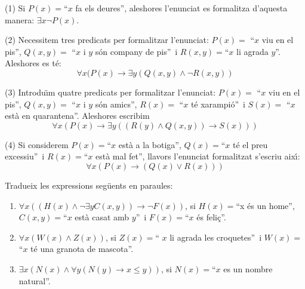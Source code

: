 \begin{solucio}
(1) Si $P(x)=$\textquotedblleft$x$ fa els deures\textquotedblright, aleshores
l'enunciat es formalitza d'aquesta manera: $\exists x\lnot P(x)$.

(2) Necessitem tres predicats per formalitzar l'enunciat: $P(x)=$%
\textquotedblleft$x$ viu en el pis\textquotedblright, $Q(x,y)=$%
\textquotedblleft$x$ i $y$ s\'{o}n company de pis\textquotedblright\ i
$R(x,y)=$\textquotedblleft$x$ li agrada $y$\textquotedblright. Aleshores es
t\'{e}:%
\[
\forall x(P(x)\longrightarrow\exists y\left(  Q\left(  x,y\right)  \wedge\lnot
R\left(  x,y\right)  \right)
\]


(3) Introdu\"{\i}m quatre predicats per formalitzar l'enunciat: $P(x)=$%
\textquotedblleft$x$ viu en el pis\textquotedblright, $Q(x,y)=$%
\textquotedblleft$x$ i $y$ s\'{o}n amics\textquotedblright, $R(x)=$%
\textquotedblleft$x$ t\'{e} xarampi\'{o}\textquotedblright\ i $S(x)=$%
\textquotedblleft$x$ est\`{a} en quarantena\textquotedblright. Aleshores
escribim%
\[
\forall x\left(  P(x)\longrightarrow\exists y\left(  \left(  R(y)\wedge
Q\left(  x,y\right)  \right)  \longrightarrow S(x)\right)  \right)
\]


(4) Si considerem $P(x)=$\textquotedblleft$x$ est\`{a} a la
botiga\textquotedblright, $Q(x)=$\textquotedblleft$x$ t\'{e} el preu
excessiu\textquotedblright\ i $R(x)=$\textquotedblleft$x$ est\`{a} mal
fet\textquotedblright, llavors l'enunciat formalitzat s'escriu aix\'{\i}:%
\[
\forall x\left(  P(x)\longrightarrow\left(  Q(x)\vee R(x)\right)  \right)
\]

\end{solucio}

\begin{exer}
Tradueix les expressions seg\"{u}ents en paraules:

\begin{enumerate}
\item $\forall x\left(  \left(  H(x)\wedge\lnot\exists yC(x,y)\right)
\longrightarrow\lnot F(x)\right)  $, si $H(x)=$\textquotedblleft x \'{e}s un
home\textquotedblright, $C(x,y)=$\textquotedblleft$x$ est\`{a} casat amb $y
$\textquotedblright\ i $F(x)=$\textquotedblleft$x$ \'{e}s
feli\c{c}\textquotedblright.

\item $\forall x\left(  W(x)\wedge Z(x)\right)  $, si $Z(x)=$\textquotedblleft%
$x$ li agrada les croquetes\textquotedblright\ i $W(x)=$\textquotedblleft$x$
t\'{e} una granota de mascota\textquotedblright.

\item $\exists x\left(  N(x)\wedge\forall y\left(  N(y)\longrightarrow x\leq
y\right)  \right)  $, si $N(x)=$\textquotedblleft$x$ es un nombre
natural\textquotedblright.
\end{enumerate}
\end{exer}

